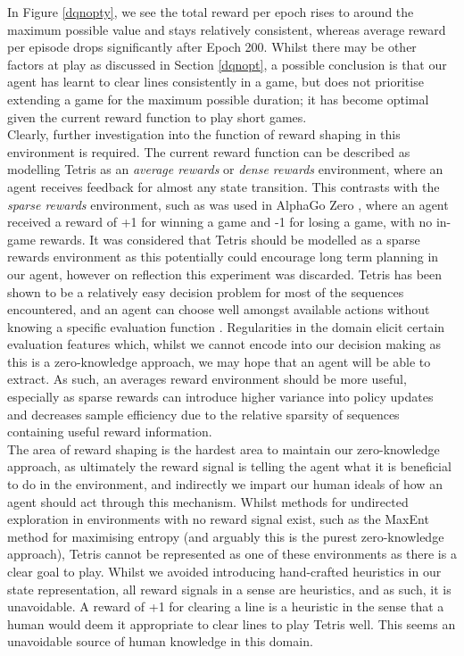 \documentclass[12pt]{article}
\begin{document}
In Figure \ref{dqnopty}, we see the total reward per epoch rises to around the maximum possible value and stays relatively consistent, whereas average reward per episode drops significantly after Epoch 200. Whilst there may be other factors at play as discussed in Section \ref{dqnopt}, a possible conclusion is that our agent has learnt to clear lines consistently in a game, but does not prioritise extending a game for the maximum possible duration; it has become optimal given the current reward function to play short games. \\\newline
Clearly, further investigation into the function of reward shaping in this environment is required. The current reward function can be described as modelling Tetris as an \textit{average rewards} or \textit{dense rewards} environment, where an agent receives feedback for almost any state transition. This contrasts with the \textit{sparse rewards} environment, such as was used in AlphaGo Zero \autocite{Silver2017}, where an agent received a reward of +1 for winning a game and -1 for losing a game, with no in-game rewards. It was considered that Tetris should be modelled as a sparse rewards environment as this potentially could encourage long term planning in our agent, however on reflection this experiment was discarded. Tetris has been shown to be a relatively easy decision problem for most of the sequences encountered, and an agent can choose well amongst available actions without knowing a specific evaluation function \autocite{csimcsek2016most}. Regularities in the domain elicit certain evaluation features which, whilst we cannot encode into our decision making as this is a zero-knowledge approach, we may hope that an agent will be able to extract. As such, an averages reward environment should be more useful, especially as sparse rewards can introduce higher variance into policy updates and decreases sample efficiency due to the relative sparsity of sequences containing useful reward information. \\\newline
The area of reward shaping is the hardest area to maintain our zero-knowledge approach, as ultimately the reward signal is telling the agent what it is beneficial to do in the environment, and indirectly we impart our human ideals of how an agent should act through this mechanism. Whilst methods for undirected exploration in environments with no reward signal exist, such as the MaxEnt method for maximising entropy \autocite{hazan2019provably} (and arguably this is the purest zero-knowledge approach), Tetris cannot be represented as one of these environments as there is a clear goal to play. Whilst we avoided introducing hand-crafted heuristics in our state representation, all reward signals in a sense are heuristics, and as such, it is unavoidable. A reward of +1 for clearing a line is a heuristic in the sense that a human would deem it appropriate to clear lines to play Tetris well. This seems an unavoidable source of human knowledge in this domain. \\\newline
\end{document}
